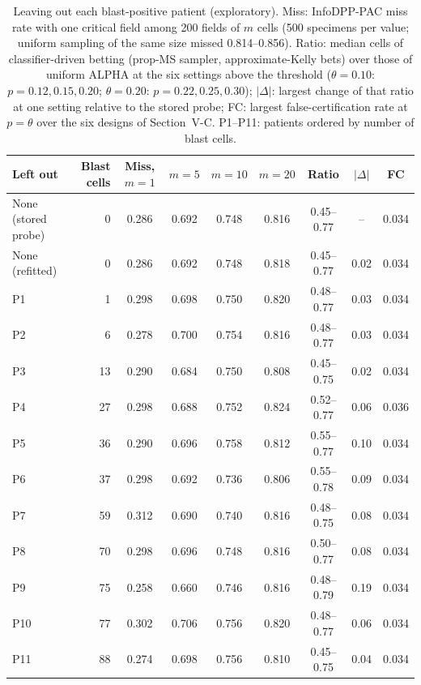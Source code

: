 \documentclass[journal]{IEEEtran}
\begin{document}
\begin{table}[t]
\centering\footnotesize
\caption{Leaving out each blast-positive patient (exploratory). Miss: InfoDPP-PAC miss rate with one critical field among 200 fields of $m$ cells (500 specimens per value; uniform sampling of the same size missed 0.814--0.856). Ratio: median cells of classifier-driven betting (prop-MS sampler, approximate-Kelly bets) over those of uniform ALPHA at the six settings above the threshold ($\theta=0.10$: $p=0.12,0.15,0.20$; $\theta=0.20$: $p=0.22,0.25,0.30$); $|\Delta|$: largest change of that ratio at one setting relative to the stored probe; FC: largest false-certification rate at $p=\theta$ over the six designs of Section~V-C. P1--P11: patients ordered by number of blast cells.}\label{tab:lopo}
\begin{tabular}{@{}lrccccccc@{}}
\toprule
Left out & Blast cells & Miss, $m=1$ & $m=5$ & $m=10$ & $m=20$ & Ratio & $|\Delta|$ & FC\\
\midrule
None (stored probe) & 0 & 0.286 & 0.692 & 0.748 & 0.816 & 0.45--0.77 & -- & 0.034\\
None (refitted) & 0 & 0.286 & 0.692 & 0.748 & 0.818 & 0.45--0.77 & 0.02 & 0.034\\
P1 & 1 & 0.298 & 0.698 & 0.750 & 0.820 & 0.48--0.77 & 0.03 & 0.034\\
P2 & 6 & 0.278 & 0.700 & 0.754 & 0.816 & 0.48--0.77 & 0.03 & 0.034\\
P3 & 13 & 0.290 & 0.684 & 0.750 & 0.808 & 0.45--0.75 & 0.02 & 0.034\\
P4 & 27 & 0.298 & 0.688 & 0.752 & 0.824 & 0.52--0.77 & 0.06 & 0.036\\
P5 & 36 & 0.290 & 0.696 & 0.758 & 0.812 & 0.55--0.77 & 0.10 & 0.034\\
P6 & 37 & 0.298 & 0.692 & 0.736 & 0.806 & 0.55--0.78 & 0.09 & 0.034\\
P7 & 59 & 0.312 & 0.690 & 0.740 & 0.816 & 0.48--0.75 & 0.08 & 0.034\\
P8 & 70 & 0.298 & 0.696 & 0.748 & 0.816 & 0.50--0.77 & 0.08 & 0.034\\
P9 & 75 & 0.258 & 0.660 & 0.746 & 0.816 & 0.48--0.79 & 0.19 & 0.034\\
P10 & 77 & 0.302 & 0.706 & 0.756 & 0.820 & 0.48--0.77 & 0.06 & 0.034\\
P11 & 88 & 0.274 & 0.698 & 0.756 & 0.810 & 0.45--0.75 & 0.04 & 0.034\\
\bottomrule
\end{tabular}
\end{table}
\end{document}
